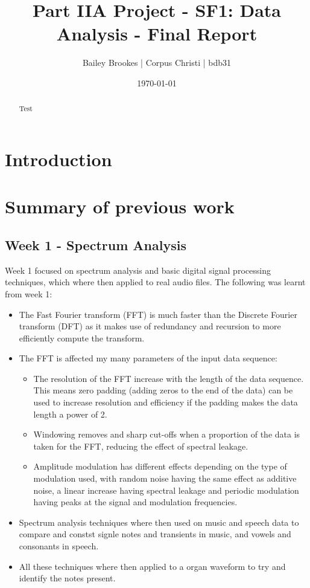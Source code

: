 \documentclass[12pt]{article}
\title{Part IIA Project - SF1: Data Analysis - Final Report}
\author{Bailey Brookes | Corpus Christi | bdb31}
\date{\today}
\begin{document}
\maketitle
\begin{abstract}
Test
\end{abstract}
\tableofcontents

\section{Introduction}
\section{Summary of previous work}
\subsection{Week 1 - Spectrum Analysis}
Week 1 focused on spectrum analysis and basic digital signal processing techniques, which where then applied to real audio files. The following was learnt from week 1:

\begin{itemize}
	\item The Fast Fourier transform (FFT) is much faster than the Discrete Fourier transform (DFT) as it makes use of redundancy and recursion to more efficiently compute the transform.
	\item The FFT is affected my many parameters of the input data sequence:
	\begin{itemize}
		\item The resolution of the FFT increase with the length of the data sequence. This means zero padding (adding zeros to the end of the data) can be used to increase resolution and efficiency if the padding makes the data length a power of 2.
		\item Windowing removes and sharp cut-offs when a proportion of the data is taken for the FFT, reducing the effect of spectral leakage. 
		\item Amplitude modulation has different effects depending on the type of modulation used, with random noise having the same effect as additive noise, a linear increase having spectral leakage and periodic modulation having peaks at the signal and modulation frequencies.   
	\end{itemize}
	\item Spectrum analysis techniques where then used on music and speech data to compare and constst signle notes and transients in music, and vowels and consonants in speech.
	\item All these techniques where then applied to a organ waveform to try and identify the notes present.
\end{itemize}
\end{document}
